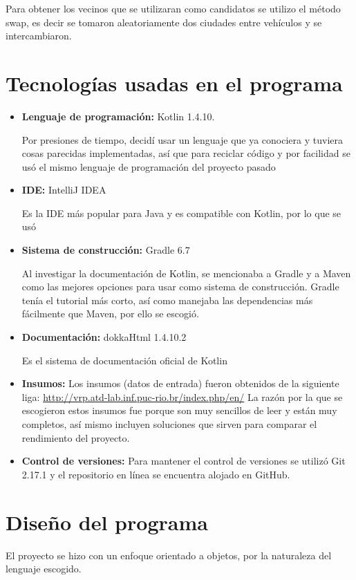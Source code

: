 \documentclass{article}
\begin{document}
Para obtener los vecinos que se utilizaran como candidatos se utilizo el método swap, es decir se tomaron aleatoriamente dos ciudades entre vehículos y se intercambiaron.

\section{Tecnologías usadas en el programa}
\begin{itemize}
	\item{ \textbf{Lenguaje de programación:} Kotlin 1.4.10. 
		
		Por presiones de tiempo, decidí usar un lenguaje que ya conociera y tuviera cosas parecidas implementadas, así que para reciclar código y por facilidad se usó el mismo lenguaje de programación del proyecto pasado}
	\item {\textbf{IDE:} IntelliJ IDEA
		
		Es la IDE más popular para Java y es compatible con Kotlin, por lo que se usó}
	\item {\textbf{Sistema de construcción:} Gradle 6.7
		
		Al investigar la documentación de Kotlin, se mencionaba a Gradle y a Maven como las mejores opciones para usar como sistema de construcción. Gradle tenía el tutorial más corto, así como manejaba las dependencias más fácilmente que Maven, por ello se escogió.
	}
	\item {\textbf{Documentación:} dokkaHtml 1.4.10.2  
		
		Es el sistema de documentación oficial de Kotlin}
	\item {
	\textbf{Insumos:} Los insumos (datos de entrada) fueron obtenidos de la siguiente liga: \hyperlink{http://vrp.atd-lab.inf.puc-rio.br/index.php/en/}{http://vrp.atd-lab.inf.puc-rio.br/index.php/en/}
	La razón por la que se escogieron estos insumos fue porque son muy sencillos de leer y están muy completos, así mismo incluyen soluciones que sirven para comparar el rendimiento del proyecto.
	}
	\item {\textbf{Control de versiones:} Para mantener el control de versiones se utilizó Git 2.17.1 y el repositorio en línea se encuentra alojado en GitHub.}
\end{itemize}

\section{Diseño del programa}


El proyecto se hizo con un enfoque orientado a objetos, por la naturaleza del lenguaje escogido. 
\end{document}
